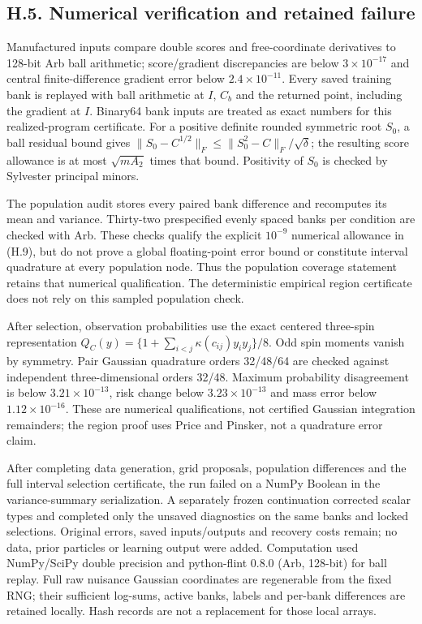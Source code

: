 \documentclass{article}
\begin{document}
\subsection*{H.5. Numerical verification and retained
failure}\label{h.5.-numerical-verification-and-retained-failure}

Manufactured inputs compare double scores and free-coordinate
derivatives to 128-bit Arb ball arithmetic; score/gradient discrepancies
are below \(3\times10^{-17}\) and central finite-difference gradient
error below \(2.4\times10^{-11}\). Every saved training bank is replayed
with ball arithmetic at \(I\), \(C_b\) and the returned point, including
the gradient at \(I\). Binary64 bank inputs are treated as exact numbers
for this realized-program certificate. For a positive definite rounded
symmetric root \(S_0\), a ball residual bound gives
\(\|S_0-C^{1/2}\|_F\le\|S_0^2-C\|_F/\sqrt\delta\); the resulting score
allowance is at most \(\sqrt{mA_2}\) times that bound. Positivity of
\(S_0\) is checked by Sylvester principal minors.

The population audit stores every paired bank difference and recomputes
its mean and variance. Thirty-two prespecified evenly spaced banks per
condition are checked with Arb. These checks qualify the explicit
\(10^{-9}\) numerical allowance in (H.9), but do not prove a global
floating-point error bound or constitute interval quadrature at every
population node. Thus the population coverage statement retains that
numerical qualification. The deterministic empirical region certificate
does not rely on this sampled population check.

After selection, observation probabilities use the exact centered
three-spin representation
\(Q_C(y)=\{1+\sum_{i<j}\kappa(c_{ij})y_iy_j\}/8\). Odd spin moments
vanish by symmetry. Pair Gaussian quadrature orders 32/48/64 are checked
against independent three-dimensional orders 32/48. Maximum probability
disagreement is below \(3.21\times10^{-13}\), risk change below
\(3.23\times10^{-13}\) and mass error below \(1.12\times10^{-16}\).
These are numerical qualifications, not certified Gaussian integration
remainders; the region proof uses Price and Pinsker, not a quadrature
error claim.

After completing data generation, grid proposals, population differences
and the full interval selection certificate, the run failed on a NumPy
Boolean in the variance-summary serialization. A separately frozen
continuation corrected scalar types and completed only the unsaved
diagnostics on the same banks and locked selections. Original errors,
saved inputs/outputs and recovery costs remain; no data, prior particles
or learning output were added. Computation used NumPy/SciPy double
precision and python-flint 0.8.0 (Arb, 128-bit) for ball replay. Full
raw nuisance Gaussian coordinates are regenerable from the fixed RNG;
their sufficient log-sums, active banks, labels and per-bank differences
are retained locally. Hash records are not a replacement for those local
arrays.
\end{document}
